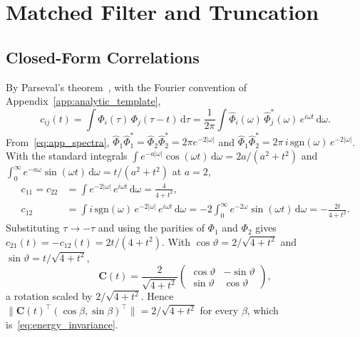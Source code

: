 \section{Matched Filter and Truncation}\label{app:det_loc_trunc}

\subsection{Closed-Form Correlations}\label{app:correlations}

By Parseval's theorem~\cite{bracewell2000fourier}, with the Fourier convention of Appendix~\ref{app:analytic_template},
\begin{equation}
c_{ij}(t) = \int \Phi_i(\tau)\,\Phi_j(\tau - t)\,\mathrm{d}\tau = \frac{1}{2\pi}\int \hat{\Phi}_i(\omega)\,\hat{\Phi}_j^{*}(\omega)\,e^{i\omega t}\,\mathrm{d}\omega.
\label{eq:app_parseval}
\end{equation}
From~\eqref{eq:app_spectra}, $\hat{\Phi}_1\hat{\Phi}_1^{*} = \hat{\Phi}_2\hat{\Phi}_2^{*} = 2\pi e^{-2|\omega|}$ and $\hat{\Phi}_1\hat{\Phi}_2^{*} = 2\pi\, i\,\mathrm{sgn}(\omega)\, e^{-2|\omega|}$. With the standard integrals $\int e^{-a|\omega|}\cos(\omega t)\,\mathrm{d}\omega = 2a/(a^2 + t^2)$ and $\int_0^\infty e^{-a\omega}\sin(\omega t)\,\mathrm{d}\omega = t/(a^2 + t^2)$ at $a = 2$,
\begin{equation}
\begin{aligned}
c_{11} = c_{22} &= \int e^{-2|\omega|}\,e^{i\omega t}\,\mathrm{d}\omega = \frac{4}{4 + t^2},\\
c_{12} &= \int i\,\mathrm{sgn}(\omega)\,e^{-2|\omega|}\,e^{i\omega t}\,\mathrm{d}\omega = -2\int_0^\infty e^{-2\omega}\sin(\omega t)\,\mathrm{d}\omega = -\frac{2t}{4 + t^2}.
\end{aligned}
\label{eq:app_cij}
\end{equation}
Substituting $\tau \to -\tau$ and using the parities of $\Phi_1$ and $\Phi_2$ gives $c_{21}(t) = -c_{12}(t) = 2t/(4 + t^2)$. With $\cos\vartheta = 2/\sqrt{4 + t^2}$ and $\sin\vartheta = t/\sqrt{4 + t^2}$,
\begin{equation}
\mathbf{C}(t) = \frac{2}{\sqrt{4 + t^2}}\begin{pmatrix} \cos\vartheta & -\sin\vartheta \\ \sin\vartheta & \cos\vartheta \end{pmatrix},
\label{eq:app_rotation}
\end{equation}
a rotation scaled by $2/\sqrt{4 + t^2}$. Hence $\|\mathbf{C}(t)^{\top}(\cos\beta, \sin\beta)^{\top}\| = 2/\sqrt{4 + t^2}$ for every $\beta$, which is~\eqref{eq:energy_invariance}.

